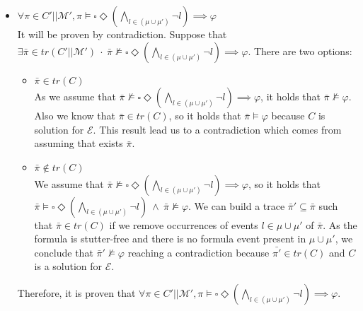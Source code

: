 \begin{itemize}
\begin{itemize}
        
    \end{itemize}


    
    \item $\forall \pi \in C' || \mathcal{M'},  \pi \vDash \square \Diamond (\bigwedge_{l \in (\mu \cup \mu')} \neg l) \implies \varphi $ \\
    It will be proven by contradiction. Suppose that $\exists \bar{\pi} \in tr( C' || \mathcal{M'}) \ \cdot \ \bar{\pi} \nvDash \square \Diamond (\bigwedge_{l \in (\mu \cup \mu')} \neg l) \implies \varphi$. There are two options:
    
    \begin{itemize}
        \item $\bar{\pi} \in tr(C)$ \\
        As we assume that $\bar{\pi} \nvDash \square \Diamond (\bigwedge_{l \in (\mu \cup \mu')} \neg l) \implies \varphi$, it holds that $\bar{\pi} \nvDash \varphi$. Also we know that $\bar{\pi} \in tr(C)$, so it holds that $\bar{\pi} \vDash \varphi$ because $C$ is solution for $\mathcal{E}$. This result lead us to a contradiction which comes from assuming that exists $\bar{\pi}$.
        \item $\bar{\pi} \notin tr(C)$ \\
        We assume that $\bar{\pi} \nvDash \square \Diamond (\bigwedge_{l \in (\mu \cup \mu')} \neg l) \implies \varphi$, so it holds that $\bar{\pi} \vDash \square \Diamond (\bigwedge_{l \in (\mu \cup \mu')} \neg l) \ \wedge \ \bar{\pi} \nvDash \varphi$. We can build a trace $\bar{\pi}' \subseteq \bar{\pi}$ such that $\bar{\pi}\in tr(C)$ if we remove occurrences of events $l\in \mu\cup\mu'$ of $\bar{\pi}$. As the formula  is stutter-free and there is no formula event present in $\mu\cup\mu'$, we conclude that $\bar{\pi}' \nvDash \varphi$ reaching a contradiction because $\bar{\pi'} \in tr(C)$ and $C$ is a solution for $\mathcal{E}$.
    \end{itemize}
Therefore, it is proven that $\forall \pi \in C' || \mathcal{M'},  \pi \vDash \square \Diamond (\bigwedge_{l \in (\mu \cup \mu')} \neg l) \implies \varphi$.
\end{itemize}
